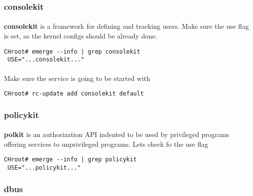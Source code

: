 \documentclass[10pt,a4paper]{article}
\begin{document}
                \newpage
                \subsubsection{consolekit}

                    \paragraph{} \textbf{consolekit} is a framework for defining and tracking users. Make sure the use flag is set, as the kernel configs should be already done.

                    \begin{lstlisting}[style=BashInputCHRoot]
 CHroot# emerge --info | grep consolekit
 USE="...consolekit..."
                    \end{lstlisting}

                    \paragraph{} Make sure the service is going to be started with

                    \begin{lstlisting}[style=BashInputCHRoot]
 CHroot# rc-update add consolekit default
                    \end{lstlisting}

                \newpage
                \subsubsection{policykit}

                    \paragraph{} \textbf{polkit} is an authorization API indented to be used by privileged programs offering services to unprivileged programs. Lets check fo the use flag

                    \begin{lstlisting}[style=BashInputCHRoot]
 CHroot# emerge --info | grep policykit
 USE="...policykit..."
                    \end{lstlisting}

                \newpage
                \subsubsection{dbus}
\end{document}
